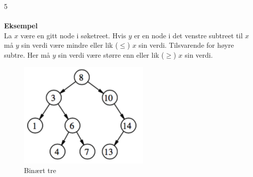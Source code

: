 5
\\\\
\noindent \textbf{Eksempel}\\
La $x$ være en gitt node i søketreet. Hvis $y$ er en node i det venstre subtreet til $x$ må $y$ sin verdi være mindre eller lik ($\leq$) $x$ sin verdi. Tilsvarende for høyre subtre. Her må $y$ sin verdi være større enn eller lik ($\geq$) $x$ sin verdi.

\begin{figure}[H]
\includegraphics[scale=0.7]{images/binaer}
\centering %
\caption{Binært tre}
\label{fig:binaer}
\end{figure}

